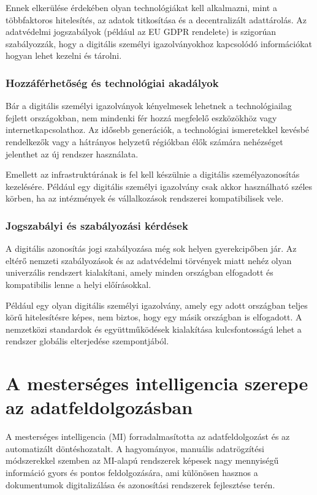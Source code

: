 \documentclass[
]{thesis-ekf}
\theoremstyle{definition}
\theoremstyle{remark}
\begin{document}
	Ennek elkerülése érdekében olyan technológiákat kell alkalmazni, mint a többfaktoros hitelesítés, az adatok titkosítása és a decentralizált adattárolás. Az adatvédelmi jogszabályok (például az EU GDPR rendelete) is szigorúan szabályozzák, hogy a digitális személyi igazolványokhoz kapcsolódó információkat hogyan lehet kezelni és tárolni.
	\subsection{Hozzáférhetőség és technológiai akadályok}
	Bár a digitális személyi igazolványok kényelmesek lehetnek a technológiailag fejlett országokban, nem mindenki fér hozzá megfelelő eszközökhöz vagy internetkapcsolathoz. Az idősebb generációk, a technológiai ismeretekkel kevésbé rendelkezők vagy a hátrányos helyzetű régiókban élők számára nehézséget jelenthet az új rendszer használata.
	
	Emellett az infrastruktúrának is fel kell készülnie a digitális személyazonosítás kezelésére. Például egy digitális személyi igazolvány csak akkor használható széles körben, ha az intézmények és vállalkozások rendszerei kompatibilisek vele.
	\subsection{Jogszabályi és szabályozási kérdések}
	A digitális azonosítás jogi szabályozása még sok helyen gyerekcipőben jár. Az eltérő nemzeti szabályozások és az adatvédelmi törvények miatt nehéz olyan univerzális rendszert kialakítani, amely minden országban elfogadott és kompatibilis lenne a helyi előírásokkal.
	
	Például egy olyan digitális személyi igazolvány, amely egy adott országban teljes körű hitelesítésre képes, nem biztos, hogy egy másik országban is elfogadott. A nemzetközi standardok és együttműködések kialakítása kulcsfontosságú lehet a rendszer globális elterjedése szempontjából.
	
	\chapter{A mesterséges intelligencia szerepe az adatfeldolgozásban}
	A mesterséges intelligencia (MI) forradalmasította az adatfeldolgozást és az automatizált döntéshozatalt. A hagyományos, manuális adatrögzítési módszerekkel szemben az MI-alapú rendszerek képesek nagy mennyiségű információ gyors és pontos feldolgozására, ami különösen hasznos a dokumentumok digitalizálása és azonosítási rendszerek fejlesztése terén.
	
\end{document}
